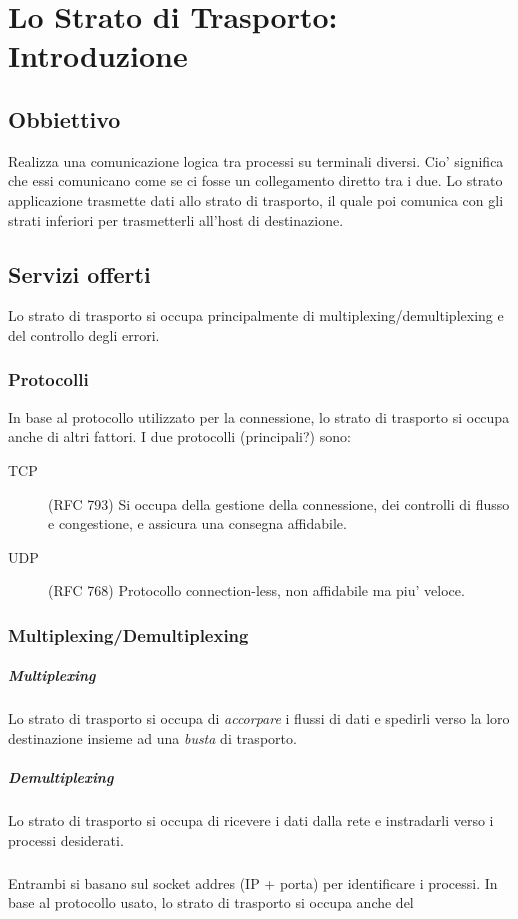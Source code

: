 \chapter{Lo Strato di Trasporto: Introduzione}
\section{Obbiettivo}
Realizza una comunicazione logica tra processi su terminali diversi.
Cio' significa che essi comunicano come se ci fosse un collegamento diretto tra i due.
Lo strato applicazione trasmette dati allo strato di trasporto, il quale poi comunica con gli strati inferiori per trasmetterli all'host di destinazione.
\section{Servizi offerti}
Lo strato di trasporto si occupa principalmente di multiplexing/demultiplexing e del controllo degli errori.
\subsection{Protocolli}
In base al protocollo utilizzato per la connessione, lo strato di trasporto si occupa anche di altri fattori.
I due protocolli {\tiny(principali?)} sono:
\begin{description}
    \item[TCP] (RFC 793) Si occupa della gestione della connessione, dei controlli di flusso e congestione, e assicura una consegna affidabile.
    \item[UDP] (RFC 768) Protocollo connection-less, non affidabile ma piu' veloce. 
\end{description}
\subsection{Multiplexing/Demultiplexing}
\paragraph{Multiplexing} Lo strato di trasporto si occupa di \textit{accorpare} i flussi di dati e spedirli verso la loro destinazione insieme ad una \textit{busta} di trasporto.
\paragraph{Demultiplexing} Lo strato di trasporto si occupa di ricevere i dati dalla rete e instradarli verso i processi desiderati.
\paragraph{} Entrambi si basano sul socket addres (IP + porta) per identificare i processi.
In base al protocollo usato, lo strato di trasporto si occupa anche del 
